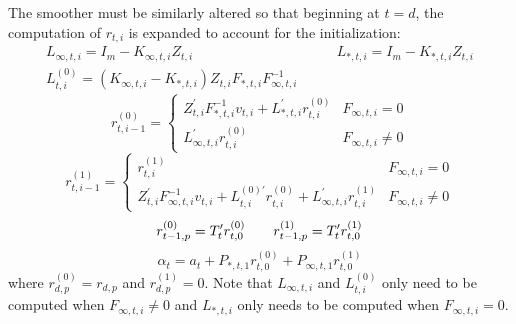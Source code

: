 \documentclass[12pt]{article}
\begin{document}
	The smoother must be similarly altered so that beginning at $t = d$, the computation of $r_{t,i}$ is expanded to account for the initialization:
	\begin{align*}
	L_{\infty,t,i} = I_m - K_{\infty,t,i} Z_{t,i} &\qquad
	L_{*,t,i} = I_m - K_{*,t,i} Z_{t,i} \\
	L_{t,i}^{(0)} = \left(K_{\infty,t,i} - K_{*,t,i} \right) Z_{t,i} F_{*,t,i} F_{\infty,t,i}^{-1} &
	\end{align*}
	\begin{equation*}
	r_{t,i-1}^{(0)} = \begin{cases} 
	   Z_{t,i}^\prime F_{*,t,i}^{-1} v_{t,i} + L_{*,t,i}^\prime r_{t,i}^{(0)} & F_{\infty,t,i} = 0 \\
	   L_{\infty,t,i}^\prime r_{t,i}^{(0)} & F_{\infty,t,i} \neq 0	   
	\end{cases} 
	\end{equation*}
	\begin{equation*}
	r_{t,i-1}^{(1)} = \begin{cases} 
	   r_{t,i}^{(1)} & F_{\infty,t,i} = 0 \\
	   Z_{t,i}^\prime F_{\infty,t,i}^{-1} v_{t,i} + L_{t,i}^{(0)\prime} r_{t,i}^{(0)} + L_{\infty,t,i}^\prime r_{t,i}^{(1)} & F_{\infty,t,i} \neq 0	   
	\end{cases} 
	\end{equation*}
	\begin{equation*}
	r_{t-1,p}^{(0)} = T_t^\prime r_{t,0}^{(0)} \qquad r_{t-1,p}^{(1)} = T_t^\prime r_{t,0}^{(1)}  \\
	\end{equation*}
	\begin{equation*}
	\hat{\alpha}_t = a_t + P_{*,t,1} r_{t,0}^{(0)} + P_{\infty,t,1} r_{t,0}^{(1)}
	\end{equation*}
	where $r_{d,p}^{(0)} = r_{d,p}$ and $r_{d,p}^{(1)} = 0$. Note that $L_{\infty,t,i}$ and $L_{t,i}^{(0)}$ only need to be computed when $F_{\infty,t,i} \neq 0$ and $L_{*,t,i}$ only needs to be computed when $F_{\infty,t,i} = 0$. 
\end{document}
